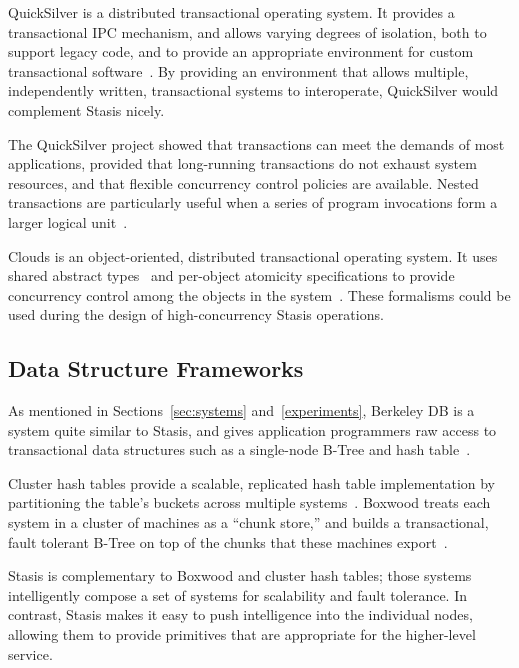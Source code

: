 \documentclass[letterpaper,twocolumn,10pt]{article}
\newcommand{\yad}{Stasis\xspace}
\begin{document}
QuickSilver is a distributed transactional operating system.  It
provides a transactional IPC mechanism, and
allows varying degrees of isolation, both to support legacy code, and
to provide an appropriate environment for custom transactional software~\cite{recoveryInQuickSilver}.
By providing an environment that allows multiple, 
independently written, transactional systems to interoperate, QuickSilver
would complement \yad nicely.

The QuickSilver project showed that transactions can meet the demands of most
applications, provided that long-running transactions do not exhaust
system resources, and that flexible concurrency control policies are
available.  Nested transactions are 
particularly useful when a series of program invocations
form a larger logical unit~\cite{experienceWithQuickSilver}.

Clouds is an object-oriented, distributed transactional operating
system.  It uses shared abstract types~\cite{sharedAbstractTypes} and
per-object atomicity specifications to provide concurrency control
among the objects in the system~\cite{clouds}.  These formalisms could
be used during the design of high-concurrency \yad operations.

\subsection{Data Structure Frameworks}

As mentioned in Sections~\ref{sec:systems} and~\ref{experiments}, Berkeley DB is a system
quite similar to \yad, and gives application programmers raw access to
transactional data structures such as a single-node B-Tree and hash
table~\cite{libtp}.

Cluster hash tables provide a scalable, replicated hash table
implementation by partitioning the table's buckets across multiple
systems~\cite{DDS}.  Boxwood treats each system in a cluster of machines as a
``chunk store,'' and builds a transactional, fault tolerant B-Tree on
top of the chunks that these machines export~\cite{boxwood}.  

\yad is complementary to Boxwood and cluster hash tables; those
systems intelligently compose a set of systems for scalability and
fault tolerance.  In contrast, \yad makes it easy to push intelligence
into the individual nodes, allowing them to provide primitives that
are appropriate for the higher-level service.  
\end{document}
